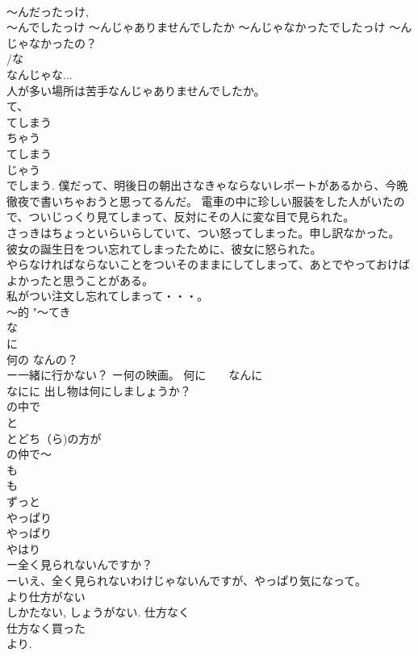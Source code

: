 \documentclass[8pt]{extreport}
\begin{document}
\begin{CJK}{UTF8}{min}
\\	～んだったっけ, 
\\	～んでしたっけ ～んじゃありませんでしたか ～んじゃなかったでしたっけ ～んじゃなかったの？ 
\\	/な
\\	なんじゃな... 
\\	人が多い場所は苦手なんじゃありませんでしたか。 
\\	て、
\\	てしまう	
\\	ちゃう 
\\	てしまう 
\\	じゃう 
\\	でしまう. 僕だって、明後日の朝出さなきゃならないレポートがあるから、今晩徹夜で書いちゃおうと思ってるんだ。 電車の中に珍しい服装をした人がいたので、ついじっくり見てしまって、反対にその人に変な目で見られた。 
\\	さっきはちょっといらいらしていて、つい怒ってしまった。申し訳なかった。 
\\	彼女の誕生日をつい忘れてしまったために、彼女に怒られた。 
\\	やらなければならないことをついそのままにしてしまって、あとでやっておけばよかったと思うことがある。 
\\	私がつい注文し忘れてしまって・・・。
\\	～的	"～てき 
\\	な 
\\	に
\\	何の	なんの？ 
\\	ー一緒に行かない？ ー何の映画。 何に　　なんに 
\\	なにに 出し物は何にしましょうか？
\\	の中で
\\	と
\\	とどち（ら)の方が
\\	の仲で～　 
\\	も
\\	も
\\	ずっと 
\\	やっぱり	
\\	やっぱり 
\\	やはり 
\\	ー全く見られないんですか？ 
\\	ーいえ、全く見られないわけじゃないんですが、やっぱり気になって。 
\\	より仕方がない	
\\	しかたない, しょうがない. 仕方なく 
\\	仕方なく買った
\\	より.

\end{CJK}
\end{document}
